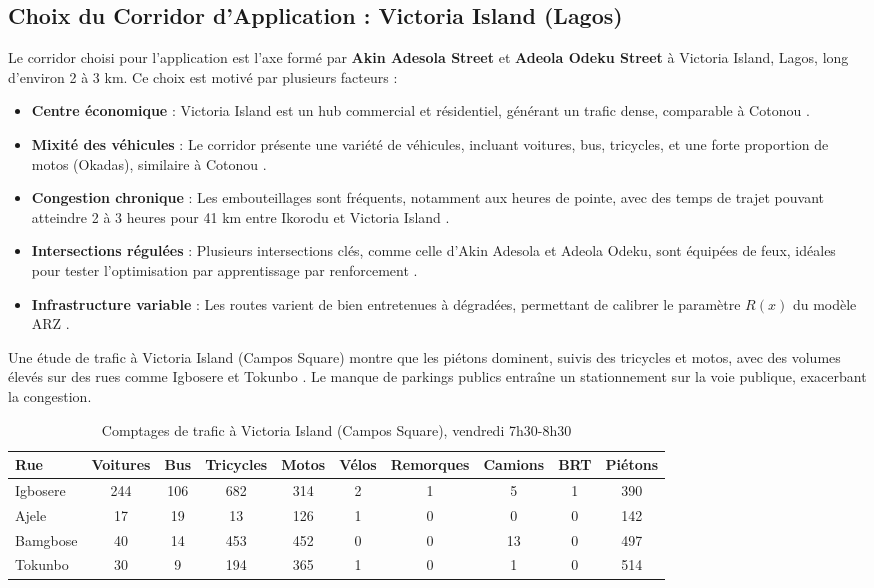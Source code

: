 \subsection{Choix du Corridor d'Application : Victoria Island (Lagos)}
Le corridor choisi pour l'application est l'axe formé par \textbf{Akin Adesola Street} et \textbf{Adeola Odeku Street} à Victoria Island, Lagos, long d'environ 2 à 3 km. Ce choix est motivé par plusieurs facteurs :
\begin{itemize}
    \item \textbf{Centre économique} : Victoria Island est un hub commercial et résidentiel, générant un trafic dense, comparable à Cotonou \cite{bbc2023lagos}.
    \item \textbf{Mixité des véhicules} : Le corridor présente une variété de véhicules, incluant voitures, bus, tricycles, et une forte proportion de motos (Okadas), similaire à Cotonou \cite{ludi2020traffic}.
    \item \textbf{Congestion chronique} : Les embouteillages sont fréquents, notamment aux heures de pointe, avec des temps de trajet pouvant atteindre 2 à 3 heures pour 41 km entre Ikorodu et Victoria Island \cite{bbc2023lagos}.
    \item \textbf{Intersections régulées} : Plusieurs intersections clés, comme celle d'Akin Adesola et Adeola Odeku, sont équipées de feux, idéales pour tester l'optimisation par apprentissage par renforcement \cite{ludi2020traffic}.
    \item \textbf{Infrastructure variable} : Les routes varient de bien entretenues à dégradées, permettant de calibrer le paramètre \(R(x)\) du modèle ARZ \cite{ludi2020traffic}.
\end{itemize}
Une étude de trafic à Victoria Island (Campos Square) montre que les piétons dominent, suivis des tricycles et motos, avec des volumes élevés sur des rues comme Igbosere et Tokunbo \cite{ludi2020traffic}. Le manque de parkings publics entraîne un stationnement sur la voie publique, exacerbant la congestion.

\begin{table}[htbp]
    \centering
    \caption{Comptages de trafic à Victoria Island (Campos Square), vendredi 7h30-8h30}
    \begin{tabular}{|l|c|c|c|c|c|c|c|c|c|}
        \hline
        Rue      & Voitures & Bus & Tricycles & Motos & Vélos & Remorques & Camions & BRT & Piétons \\
        \hline
        Igbosere & 244      & 106 & 682       & 314   & 2     & 1         & 5       & 1   & 390     \\
        Ajele    & 17       & 19  & 13        & 126   & 1     & 0         & 0       & 0   & 142     \\
        Bamgbose & 40       & 14  & 453       & 452   & 0     & 0         & 13      & 0   & 497     \\
        Tokunbo  & 30       & 9   & 194       & 365   & 1     & 0         & 1       & 0   & 514     \\
        \hline
    \end{tabular}
\end{table}

